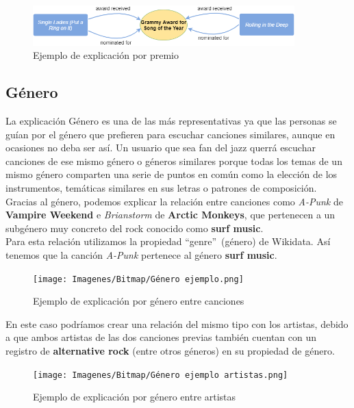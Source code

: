 \begin{figure}[h!]
	\centering
	\includegraphics[width = 0.9\textwidth]{Imagenes/Bitmap/Premio ejemplo.png}
	\caption{Ejemplo de explicación por premio}
	\label{fig:sampleImage}
\end{figure}

\subsection*{Género}

La explicación Género es una de las más representativas ya que las personas se guían por el género que prefieren para escuchar canciones similares, aunque en ocasiones no deba ser así. Un usuario que sea fan del jazz querrá escuchar canciones de ese mismo género o géneros similares porque todas los temas de un mismo género comparten una serie de puntos en común como la elección de los instrumentos, temáticas similares en sus letras o patrones de composición.\\

Gracias al género, podemos explicar la relación entre canciones como \textit{A-Punk} de \textbf{Vampire Weekend} e \textit{Brianstorm} de \textbf{Arctic Monkeys}, que pertenecen a un subgénero muy concreto del rock conocido como \textbf{surf music}.\\

Para esta relación utilizamos la propiedad ``genre''~(género) de Wikidata. Así tenemos que la canción \textit{A-Punk} pertenece al género \textbf{surf music}.\\

\begin{figure}[h!]
	\centering
	\texttt{[image: Imagenes/Bitmap/Género ejemplo.png]}
	\caption{Ejemplo de explicación por género entre canciones}
	\label{fig:sampleImage}
\end{figure}

En este caso podríamos crear una relación del mismo tipo con los artistas, debido a que ambos artistas de las dos canciones previas también cuentan con un registro de \textbf{alternative rock} (entre otros géneros) en su propiedad de género.\\

\begin{figure}[h!]
	\centering
	\texttt{[image: Imagenes/Bitmap/Género ejemplo artistas.png]}
	\caption{Ejemplo de explicación por género entre artistas}
	\label{fig:sampleImage}
\end{figure}

